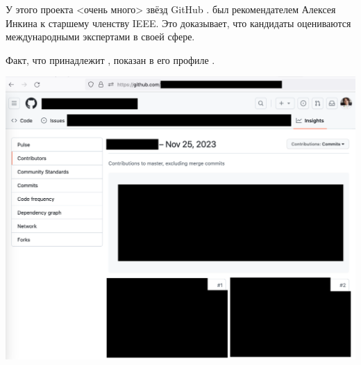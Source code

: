 
У этого проекта <очень много> звёзд GitHub .
\MrIeeeReferenceOne был рекомендателем Алексея Инкина к старшему членству IEEE.
Это доказывает, что кандидаты оцениваются международными экспертами в своей сфере.

Факт, что  принадлежит \MrIeeeReferenceOne,
показан в его профиле .

\includegraphics[width=\textwidth]{ieee-reference-one-project-two-contributors_public}

\pagebreak
